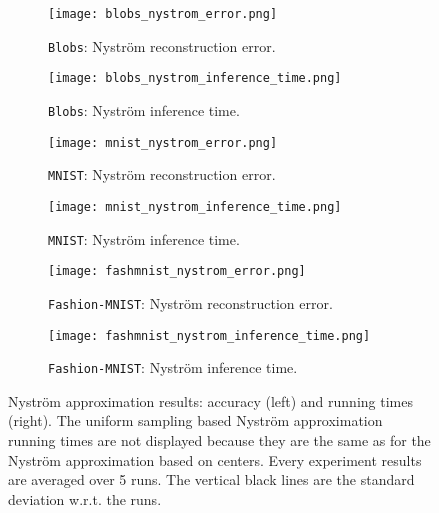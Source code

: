 \begin{figure*}
\begin{subfigure}[b]{.49\textwidth}
\texttt{[image: blobs\_nystrom\_error.png]}
\caption{\texttt{Blobs}: Nyström reconstruction error.}
\label{fig:blobs:nystrom_error}
\end{subfigure}
\begin{subfigure}[b]{.49\textwidth}
\texttt{[image: blobs\_nystrom\_inference\_time.png]}
\caption{\texttt{Blobs}: Nyström inference time.}
\label{fig:blobs:nystrom_time}
\end{subfigure}
\begin{subfigure}[b]{.49\textwidth}
\texttt{[image: mnist\_nystrom\_error.png]}
\caption{\texttt{MNIST}: Nyström reconstruction error.}
\label{fig:mnist:nystrom_error}
\end{subfigure}
\begin{subfigure}[b]{.49\textwidth}
\texttt{[image: mnist\_nystrom\_inference\_time.png]}
\caption{\texttt{MNIST}: Nyström inference time.}
\label{fig:mnist:nystrom_time}
\end{subfigure}
\begin{subfigure}[b]{.49\textwidth}
\texttt{[image: fashmnist\_nystrom\_error.png]}
\caption{\texttt{Fashion-MNIST}: Nyström reconstruction error.}
\label{fig:fashmnist:nystrom_error}
\end{subfigure}
\begin{subfigure}[b]{.49\textwidth}
\texttt{[image: fashmnist\_nystrom\_inference\_time.png]}
\caption{\texttt{Fashion-MNIST}: Nyström inference time.}
\label{fig:fashmnist:nystrom_time}
\end{subfigure}
\caption{Nystr\"om approximation results: accuracy (left) and running times (right). The uniform sampling based Nyström approximation running times are not displayed because they are the same as for the Nyström approximation based on \kmeans centers. Every experiment results are averaged over 5 runs. The vertical black lines are the standard deviation w.r.t. the runs.}
\label{fig:nystrom}
\end{figure*}












